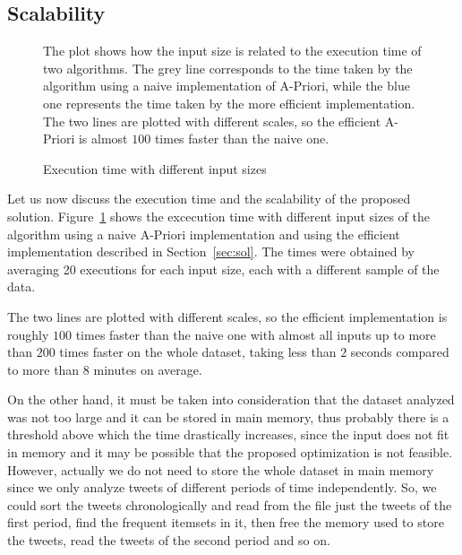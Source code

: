\subsection{Scalability}

\begin{figure}
    \caption{Execution time with different input sizes}
    \resizebox{\columnwidth}{!}{}
    \label{fig:times}
    \vspace*{-5mm}
    \begin{flushleft}
        The plot shows how the input size
        is related to the execution time of two algorithms. The grey 
        line corresponds to the time taken by the algorithm using 
        a naive implementation of A-Priori, while the blue one 
        represents the time taken by the more efficient implementation.
        The two lines are plotted with different scales, so the 
        efficient A-Priori is almost $100$ times faster than the naive one.
    \end{flushleft}
\end{figure}
Let us now discuss the execution time and the scalability of the proposed solution.
Figure~\ref{fig:times} shows the excecution time with different input sizes of the 
algorithm using a naive A-Priori implementation and using the efficient implementation
described in Section~\ref{sec:sol}.
The times were obtained by averaging 20 executions for each input size,
each with a different sample of the data. 

The two lines are plotted with different scales, so the efficient implementation is 
roughly $100$ times faster than the naive one with almost all inputs up to more than
$200$ times faster on the whole dataset, taking less than $2$ seconds compared to 
more than $8$ minutes on average. 

On the other hand, it must be taken into consideration that the dataset analyzed was not too large and it can be stored
in main memory, thus probably there is a threshold above which the 
time drastically increases, since the input does not fit in memory and 
it may be possible that the proposed optimization is not feasible.
However, actually we do not need to store the whole dataset in main memory 
since we only analyze tweets of different periods of time independently. 
So, we could sort the 
tweets chronologically and read from the file just the tweets of the first period,
find the frequent itemsets in it, then free the memory used to store the tweets, 
read the tweets of the second period and so on.

